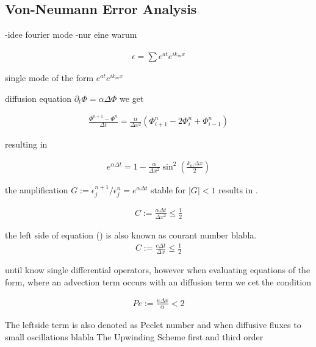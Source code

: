 \subsection{Von-Neumann Error Analysis}

-idee fourier mode
-nur eine warum

\begin{align}
    \epsilon = \sum e^{at}e^{i k_m x}
\end{align}

    single mode of the form $e^{at} e^{i k_m x}$


diffusion equation $\partial_t \Phi = \alpha \Delta \Phi$
we get

\begin{align}
    \frac{\Phi^{n+1} - \Phi^n}{\Delta t} = \frac{\alpha}{\Delta x^2}\left(\Phi_{i+1}^n - 2\Phi_{i}^n + \Phi_{i-1}^n\right)
\end{align}

resulting in

\begin{align}
    e^{\alpha \Delta t} = 1 - \frac{\alpha}{\Delta x^2} \sin^2\left(\frac{k_m \Delta x}{2}\right)
\end{align}

the amplification $G := \epsilon_j^{n+1} / \epsilon_j^n  = e^{\alpha \Delta t }$
stable for $|G|<1$ results in .

\begin{align}
    C := \frac{\alpha \Delta t}{\Delta x^2} \leq \frac{1}{2}
\end{align}

the left side of equation () is also known as courant number blabla.
\begin{align}
    C := \frac{c \Delta t}{\Delta x} \leq \frac{1}{2}
\end{align}

until know single differential operators, however when evaluating equations of the form, where an advection term occurs with an diffusion term
we cet the condition

\begin{align}
    Pe := \frac{u \Delta x}{\alpha} < 2
\end{align}

The leftside term is also denoted as Peclet number  and
when diffusive fluxes to small oscillations blabla
The Upwinding Scheme first and third  order





\newpage

